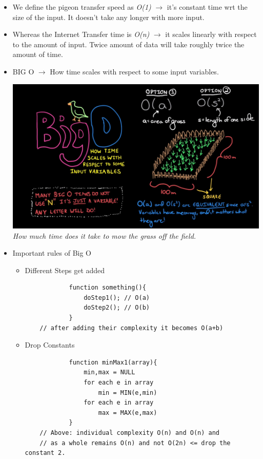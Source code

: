 \documentclass[11pt]{article}
\begin{document}
\begin{enumerate}
\begin{itemize}
            \item We define the pigeon transfer speed as \textit{O(1)} $\rightarrow$ it's constant time wrt the size of the input. It doesn't take any longer with more input.
            \item Whereas the Internet Transfer time is \textit{O(n)} $\rightarrow$ it scales linearly with respect to the amount of input. Twice amount of data will take roughly twice the amount of time.
            \item BIG O $\rightarrow$ How time scales with respect to some input variables.
            \begin{center}
                \includegraphics[width=13cm]{imgs/bigO.png}
                \textit{How much time does it take to mow the grass off the field.}
            \end{center}
            \item Important rules of Big O
            \begin{itemize}
                \item Different Steps get added
                \begin{verbatim}
            function something(){
                doStep1(); // O(a)
                doStep2(); // O(b)
            }
    // after adding their complexity it becomes O(a+b)
                \end{verbatim}
                \item Drop Constants
                \begin{verbatim}
            function minMax1(array){
                min,max = NULL
                for each e in array
                    min = MIN(e,min)
                for each e in array
                    max = MAX(e,max)
            }
    // Above: individual complexity O(n) and O(n) and 
    // as a whole remains O(n) and not O(2n) <= drop the constant 2.


\end{verbatim}
\end{itemize}
\end{itemize}
\end{enumerate}
\end{document}
